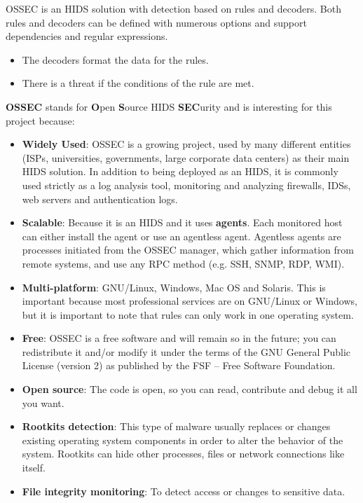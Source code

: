 \linej
\linej
OSSEC is an HIDS solution with detection based on rules and decoders. Both rules and decoders can be defined with numerous options and support dependencies and regular expressions.
\begin{itemize}
	\item The decoders format the data for the rules.
	\item There is a threat if the conditions of the rule are met.
\end{itemize}
\linej
\textbf{OSSEC} stands for \textbf{O}pen \textbf{S}ource HIDS \textbf{SEC}urity and is interesting for this project because\cite{ossec}\cite{wazuh_additional_functionality}:
\begin{itemize}
	\item \textbf{Widely Used}: OSSEC is a growing project, used by many different entities (ISPs, universities, governments, large corporate data centers) as their main HIDS solution. In addition to being deployed as an HIDS, it is commonly used strictly as a log analysis tool, monitoring and analyzing firewalls, IDSs, web servers and authentication logs.
	\item \textbf{Scalable}: Because it is an HIDS and it uses \textbf{agents}. Each monitored host can either install the agent or use an agentless agent\cite{agentless}\cite{ossec_agent}. Agentless agents are processes initiated from the OSSEC manager, which gather information from remote systems, and use any RPC method (e.g. SSH, SNMP, RDP, WMI).
	\item \textbf{Multi-platform}: GNU/Linux, Windows, Mac OS and Solaris. This is important because most professional services are on GNU/Linux or Windows, but it is important to note that rules can only work in one operating system.
	\item \textbf{Free}: OSSEC is a free software and will remain so in the future; you can redistribute it and/or modify it under the terms of the GNU General Public License (version 2) as published by the FSF -- Free Software Foundation.
	\item \textbf{Open source}: The code is open, so you can read, contribute and debug it all you want.
	\item \textbf{Rootkits detection}: This type of malware usually replaces or changes existing operating system components in order to alter the behavior of the system. Rootkits can hide other processes, files or network connections like itself.
	\item \textbf{File integrity monitoring}: To detect access or changes to sensitive data.
\end{itemize}

